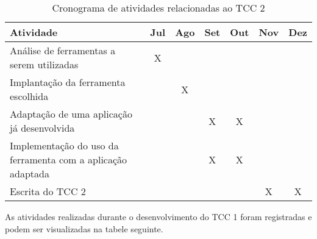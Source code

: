 \begin{table}[!h]
\centering
\caption{Cronograma de atividades relacionadas ao TCC 2}
\label{cronograma_tcc2}
\begin{tabular}{|p{9cm}|c|c|c|c|c|c|}
\hline
Atividade                                                   & \multicolumn{1}{l|}{Jul} & \multicolumn{1}{l|}{Ago} & \multicolumn{1}{l|}{Set} & \multicolumn{1}{l|}{Out} & \multicolumn{1}{l|}{Nov} & \multicolumn{1}{l|}{Dez} \\ \hline
Análise de ferramentas a serem utilizadas                   & X                           &                             &                              &                            &                             &                              \\ \hline
Implantação da ferramenta escolhida                         &                             & X                            &                              &                            &                             &                              \\ \hline
Adaptação de uma aplicação já desenvolvida                  &                             &                               & X                            & X                          &                             &                              \\ \hline
Implementação do uso da ferramenta com a aplicação adaptada &                             &                         & X                            & X                          &                             &                              \\ \hline
Escrita do TCC 2                                            &                             &                             &                              &                            & X                           & X          \\ \hline
\end{tabular}
\end{table}


As atividades realizadas durante o desenvolvimento do TCC 1 foram registradas e podem ser visualizadas na tabele seguinte.


